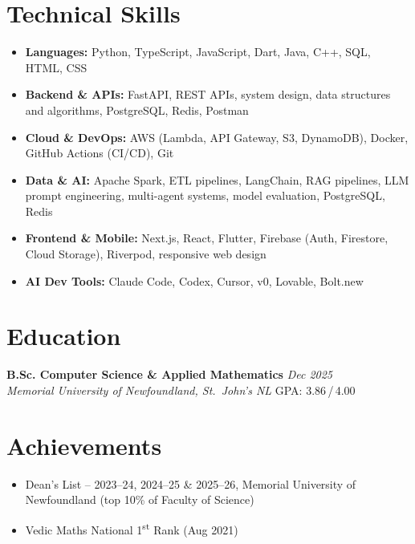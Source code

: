 \documentclass[a4paper,10pt]{article}
\begin{document}
\section{Technical Skills}
\begin{itemize}
  \item \textbf{Languages:} Python, TypeScript, JavaScript, Dart, Java, C++, SQL, HTML, CSS
  \item \textbf{Backend \& APIs:} FastAPI, REST APIs, system design, data structures and algorithms, PostgreSQL, Redis, Postman
  \item \textbf{Cloud \& DevOps:} AWS (Lambda, API Gateway, S3, DynamoDB), Docker, GitHub Actions (CI/CD), Git
  \item \textbf{Data \& AI:} Apache Spark, ETL pipelines, LangChain, RAG pipelines, LLM prompt engineering, multi-agent systems, model evaluation, PostgreSQL, Redis
  \item \textbf{Frontend \& Mobile:} Next.js, React, Flutter, Firebase (Auth, Firestore, Cloud Storage), Riverpod, responsive web design
  \item \textbf{AI Dev Tools:} Claude Code, Codex, Cursor, v0, Lovable, Bolt.new
\end{itemize}

\section{Education}
\noindent\textbf{B.Sc. Computer Science \& Applied Mathematics} \hfill \textit{\small Dec 2025}\\
\textit{\small Memorial University of Newfoundland, St.\ John's NL} \hfill \small GPA: 3.86\,/\,4.00

\section{Achievements}
\begin{itemize}
  \item Dean's List -- 2023--24, 2024--25 \& 2025--26, Memorial University of Newfoundland (top 10\% of Faculty of Science)
  \item Vedic Maths National 1\textsuperscript{st} Rank (Aug 2021)
\end{itemize}
\end{document}
